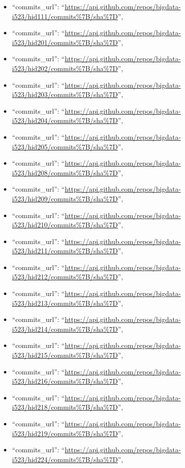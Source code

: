 \begin{itemize}
\item
  ``commits\_url'':
  ``\url{https://api.github.com/repos/bigdata-i523/hid111/commits\%7B/sha\%7D}'',
\item
  ``commits\_url'':
  ``\url{https://api.github.com/repos/bigdata-i523/hid201/commits\%7B/sha\%7D}'',
\item
  ``commits\_url'':
  ``\url{https://api.github.com/repos/bigdata-i523/hid202/commits\%7B/sha\%7D}'',
\item
  ``commits\_url'':
  ``\url{https://api.github.com/repos/bigdata-i523/hid203/commits\%7B/sha\%7D}'',
\item
  ``commits\_url'':
  ``\url{https://api.github.com/repos/bigdata-i523/hid204/commits\%7B/sha\%7D}'',
\item
  ``commits\_url'':
  ``\url{https://api.github.com/repos/bigdata-i523/hid205/commits\%7B/sha\%7D}'',
\item
  ``commits\_url'':
  ``\url{https://api.github.com/repos/bigdata-i523/hid208/commits\%7B/sha\%7D}'',
\item
  ``commits\_url'':
  ``\url{https://api.github.com/repos/bigdata-i523/hid209/commits\%7B/sha\%7D}'',
\item
  ``commits\_url'':
  ``\url{https://api.github.com/repos/bigdata-i523/hid210/commits\%7B/sha\%7D}'',
\item
  ``commits\_url'':
  ``\url{https://api.github.com/repos/bigdata-i523/hid211/commits\%7B/sha\%7D}'',
\item
  ``commits\_url'':
  ``\url{https://api.github.com/repos/bigdata-i523/hid212/commits\%7B/sha\%7D}'',
\item
  ``commits\_url'':
  ``\url{https://api.github.com/repos/bigdata-i523/hid213/commits\%7B/sha\%7D}'',
\item
  ``commits\_url'':
  ``\url{https://api.github.com/repos/bigdata-i523/hid214/commits\%7B/sha\%7D}'',
\item
  ``commits\_url'':
  ``\url{https://api.github.com/repos/bigdata-i523/hid215/commits\%7B/sha\%7D}'',
\item
  ``commits\_url'':
  ``\url{https://api.github.com/repos/bigdata-i523/hid216/commits\%7B/sha\%7D}'',
\item
  ``commits\_url'':
  ``\url{https://api.github.com/repos/bigdata-i523/hid218/commits\%7B/sha\%7D}'',
\item
  ``commits\_url'':
  ``\url{https://api.github.com/repos/bigdata-i523/hid219/commits\%7B/sha\%7D}'',
\item
  ``commits\_url'':
  ``\url{https://api.github.com/repos/bigdata-i523/hid224/commits\%7B/sha\%7D}'',

\end{itemize}
